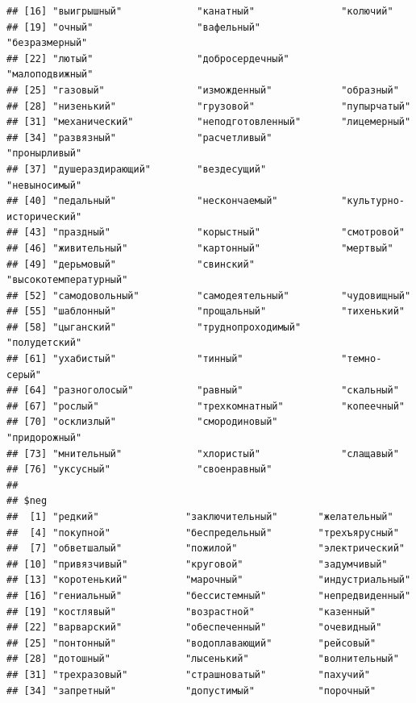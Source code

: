 \documentclass[11pt]{article}\usepackage[]{graphicx}\usepackage[]{color}
\makeatletter
\newenvironment{kframe}{%
 \def\at@end@of@kframe{}%
 \ifinner\ifhmode%
  \def\at@end@of@kframe{\end{minipage}}%
  \begin{minipage}{\columnwidth}%
 \fi\fi%
 \def\FrameCommand##1{\hskip\@totalleftmargin \hskip-\fboxsep
 \colorbox{shadecolor}{##1}\hskip-\fboxsep
     \hskip-\linewidth \hskip-\@totalleftmargin \hskip\columnwidth}%
 \MakeFramed {\advance\hsize-\width
   \@totalleftmargin\z@ \linewidth\hsize
   \@setminipage}}%
 {\par\unskip\endMakeFramed%
 \at@end@of@kframe}
\newenvironment{knitrout}{}{} %
\makeatother
\begin{document}
\begin{knitrout}
\begin{kframe}
\begin{verbatim}
## [16] "выигрышный"             "канатный"               "колючий"               
## [19] "очный"                  "вафельный"              "безразмерный"          
## [22] "лютый"                  "добросердечный"         "малоподвижный"         
## [25] "газовый"                "изможденный"            "образный"              
## [28] "низенький"              "грузовой"               "пупырчатый"            
## [31] "механический"           "неподготовленный"       "лицемерный"            
## [34] "развязный"              "расчетливый"            "пронырливый"           
## [37] "душераздирающий"        "вездесущий"             "невыносимый"           
## [40] "педальный"              "нескончаемый"           "культурно-исторический"
## [43] "праздный"               "корыстный"              "смотровой"             
## [46] "живительный"            "картонный"              "мертвый"               
## [49] "дерьмовый"              "свинский"               "высокотемпературный"   
## [52] "самодовольный"          "самодеятельный"         "чудовищный"            
## [55] "шаблонный"              "прощальный"             "тихенький"             
## [58] "цыганский"              "труднопроходимый"       "полудетский"           
## [61] "ухабистый"              "тинный"                 "темно-серый"           
## [64] "разноголосый"           "равный"                 "скальный"              
## [67] "рослый"                 "трехкомнатный"          "копеечный"             
## [70] "осклизлый"              "смородиновый"           "придорожный"           
## [73] "мнительный"             "хлористый"              "слащавый"              
## [76] "уксусный"               "своенравный"           
## 
## $neg
##  [1] "редкий"               "заключительный"       "желательный"         
##  [4] "покупной"             "беспредельный"        "трехъярусный"        
##  [7] "обветшалый"           "пожилой"              "электрический"       
## [10] "привязчивый"          "круговой"             "задумчивый"          
## [13] "коротенький"          "марочный"             "индустриальный"      
## [16] "гениальный"           "бессистемный"         "непредвиденный"      
## [19] "костлявый"            "возрастной"           "казенный"            
## [22] "варварский"           "обеспеченный"         "очевидный"           
## [25] "понтонный"            "водоплавающий"        "рейсовый"            
## [28] "дотошный"             "лысенький"            "волнительный"        
## [31] "трехразовый"          "страшноватый"         "пахучий"             
## [34] "запретный"            "допустимый"           "порочный"            

\end{verbatim}
\end{kframe}
\end{knitrout}
\end{document}
